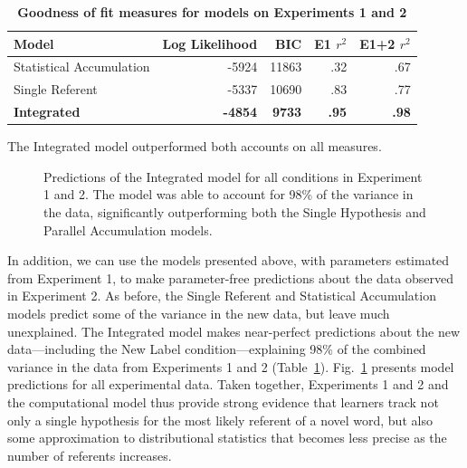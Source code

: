 \documentclass{pnastwo}
\begin{document}
\begin{article}
\begin{table}[tb]
\caption{\textbf{Goodness of fit measures for models on Experiments 1 and 2}}
\label{tab:model}
\begin{center}
\begin{tabular}{lrrrr}
\hline
Model & Log Likelihood &BIC & E1 $r^{2}$ & E1+2 $r^{2}$ \\
\hline
Statistical Accumulation & -5924 & 11863 & .32  & .67\\
Single Referent & -5337 & 10690 & .83 & .77 \\
\textbf{Integrated} & \textbf{-4854} & \textbf{9733} & \textbf{.95}  & \textbf{.98}\\
\hline
\end{tabular}
The Integrated model outperformed both accounts on all measures.
\end{center}
\end{table}





 \begin{figure}[tb]
	\caption{\label{fig:model_fit} Predictions of the Integrated model for all conditions in Experiment 1 and 2. The model was able to account for 98\% of the variance in the data, significantly outperforming both the Single Hypothesis and Parallel Accumulation models.}
\end{figure}


In addition, we can use the models presented above, with parameters estimated from Experiment 1, to make parameter-free predictions about the data observed in Experiment 2. As before, the Single Referent and Statistical Accumulation models predict some of the variance in the new data, but leave much unexplained. The Integrated model makes near-perfect predictions about the new data---including the New Label condition---explaining 98\% of the combined variance in the data from Experiments 1 and 2 (Table~\ref{tab:model}). Fig.~\ref{fig:model_fit} presents model predictions for all experimental data. Taken together, Experiments 1 and 2 and the computational model thus provide strong evidence that learners track not only a single hypothesis for the most likely referent of a novel word, but also some approximation to distributional statistics that becomes less precise as the number of referents increases.


\end{article}
\end{document}
